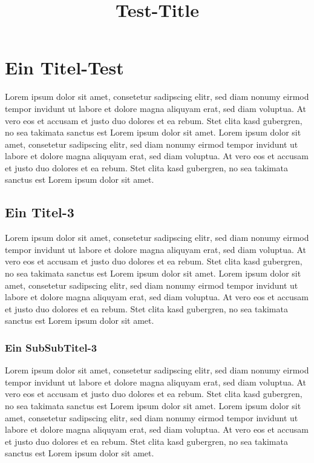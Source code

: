 \documentclass[10pt,a4paper]{report}
\title{Test-Title}
\begin{document}
\maketitle
\tableofcontents \newpage

\section{Ein Titel-Test}
Lorem ipsum dolor sit amet, consetetur sadipscing elitr, sed diam nonumy eirmod tempor invidunt ut labore et dolore magna aliquyam erat, sed diam voluptua. At vero eos et accusam et justo duo dolores et ea rebum. Stet clita kasd gubergren, no sea takimata sanctus est Lorem ipsum dolor sit amet. Lorem ipsum dolor sit amet, consetetur sadipscing elitr, sed diam nonumy eirmod tempor invidunt ut labore et dolore magna aliquyam erat, sed diam voluptua. At vero eos et accusam et justo duo dolores et ea rebum. Stet clita kasd gubergren, no sea takimata sanctus est Lorem ipsum dolor sit amet.
\subsection{Ein Titel-3}
Lorem ipsum dolor sit amet, consetetur sadipscing elitr, sed diam nonumy eirmod tempor invidunt ut labore et dolore magna aliquyam erat, sed diam voluptua. At vero eos et accusam et justo duo dolores et ea rebum. Stet clita kasd gubergren, no sea takimata sanctus est Lorem ipsum dolor sit amet. Lorem ipsum dolor sit amet, consetetur sadipscing elitr, sed diam nonumy eirmod tempor invidunt ut labore et dolore magna aliquyam erat, sed diam voluptua. At vero eos et accusam et justo duo dolores et ea rebum. Stet clita kasd gubergren, no sea takimata sanctus est Lorem ipsum dolor sit amet.
\subsubsection{Ein SubSubTitel-3}
Lorem ipsum dolor sit amet, consetetur sadipscing elitr, sed diam nonumy eirmod tempor invidunt ut labore et dolore magna aliquyam erat, sed diam voluptua. At vero eos et accusam et justo duo dolores et ea rebum. Stet clita kasd gubergren, no sea takimata sanctus est Lorem ipsum dolor sit amet. Lorem ipsum dolor sit amet, consetetur sadipscing elitr, sed diam nonumy eirmod tempor invidunt ut labore et dolore magna aliquyam erat, sed diam voluptua. At vero eos et accusam et justo duo dolores et ea rebum. Stet clita kasd gubergren, no sea takimata sanctus est Lorem ipsum dolor sit amet.
\end{document}
